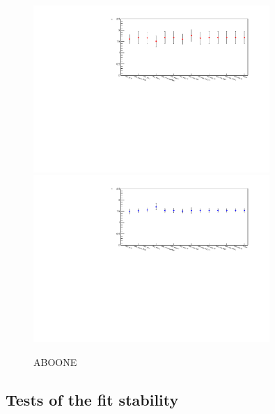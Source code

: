\begin{figure}[htbp]
	\centering
		\includegraphics[width=0.8\textwidth]{Figures/Results/Electron/systPlots/EleMTstability_abo_5FS.pdf}
		\includegraphics[width=0.8\textwidth]{Figures/Results/Electron/systPlots/EleMTstability_one_5FS.pdf}		
	\caption{ABOONE}
	\label{fig:systStability_ele}
\end{figure}



\subsection{Tests of the fit stability}

